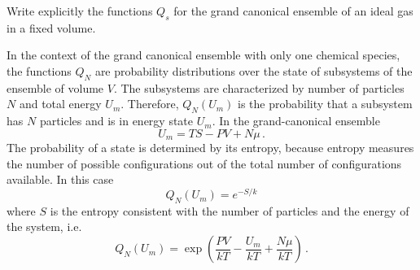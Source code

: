 

Write explicitly the functions $Q_s$ for the grand canonical ensemble of an ideal gas in a fixed volume.


In the context of the grand canonical ensemble with only one chemical species, the functions $Q_N$ are probability distributions over the state of subsystems of the ensemble of volume $V$.
The subsystems are characterized by number of particles $N$ and total energy $U_m$.
Therefore, $Q_N(U_m)$ is the probability that a subsystem has $N$ particles and is in energy state $U_m$.
In the grand-canonical ensemble
\begin{equation}
  U_m = T S - P V + N \mu
  \, .
\end{equation}
The probability of a state is determined by its entropy, because entropy measures the number of possible configurations out of the total number of configurations available.
In this case
\begin{equation}
  Q_N(U_m) = e^{-S/k}
\end{equation}
where $S$ is the entropy consistent with the number of particles and the energy of the system, i.e.
\begin{equation}
  Q_N(U_m)
  = \exp \left(\frac{PV}{kT} - \frac{U_m}{kT} + \frac{N \mu}{kT} \right)
  \, .
\end{equation}
